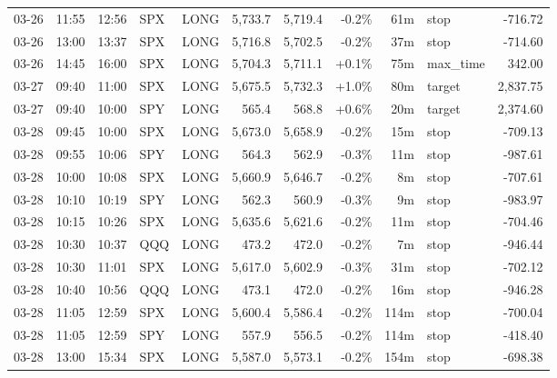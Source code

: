 \documentclass[11pt,a4paper,twoside]{article}
\begin{document}
\begin{center}
\begin{longtable}{>{\color{txtmain}}l l l l l r r r r >{\color{txtmain}}l r}
03-26 & 11:55 & 12:56 & SPX & LONG & 5,733.7 & 5,719.4 & \textcolor{lossred}{-0.2\%} & 61m & stop & \textcolor{lossred}{-716.72} \\
03-26 & 13:00 & 13:37 & SPX & LONG & 5,716.8 & 5,702.5 & \textcolor{lossred}{-0.2\%} & 37m & stop & \textcolor{lossred}{-714.60} \\
03-26 & 14:45 & 16:00 & SPX & LONG & 5,704.3 & 5,711.1 & \textcolor{wingreen}{+0.1\%} & 75m & max\_time & \textcolor{wingreen}{342.00} \\
03-27 & 09:40 & 11:00 & SPX & LONG & 5,675.5 & 5,732.3 & \textcolor{wingreen}{+1.0\%} & 80m & target & \textcolor{wingreen}{2,837.75} \\
03-27 & 09:40 & 10:00 & SPY & LONG & 565.4 & 568.8 & \textcolor{wingreen}{+0.6\%} & 20m & target & \textcolor{wingreen}{2,374.60} \\
03-28 & 09:45 & 10:00 & SPX & LONG & 5,673.0 & 5,658.9 & \textcolor{lossred}{-0.2\%} & 15m & stop & \textcolor{lossred}{-709.13} \\
03-28 & 09:55 & 10:06 & SPY & LONG & 564.3 & 562.9 & \textcolor{lossred}{-0.3\%} & 11m & stop & \textcolor{lossred}{-987.61} \\
03-28 & 10:00 & 10:08 & SPX & LONG & 5,660.9 & 5,646.7 & \textcolor{lossred}{-0.2\%} & 8m & stop & \textcolor{lossred}{-707.61} \\
03-28 & 10:10 & 10:19 & SPY & LONG & 562.3 & 560.9 & \textcolor{lossred}{-0.3\%} & 9m & stop & \textcolor{lossred}{-983.97} \\
03-28 & 10:15 & 10:26 & SPX & LONG & 5,635.6 & 5,621.6 & \textcolor{lossred}{-0.2\%} & 11m & stop & \textcolor{lossred}{-704.46} \\
03-28 & 10:30 & 10:37 & QQQ & LONG & 473.2 & 472.0 & \textcolor{lossred}{-0.2\%} & 7m & stop & \textcolor{lossred}{-946.44} \\
03-28 & 10:30 & 11:01 & SPX & LONG & 5,617.0 & 5,602.9 & \textcolor{lossred}{-0.3\%} & 31m & stop & \textcolor{lossred}{-702.12} \\
03-28 & 10:40 & 10:56 & QQQ & LONG & 473.1 & 472.0 & \textcolor{lossred}{-0.2\%} & 16m & stop & \textcolor{lossred}{-946.28} \\
03-28 & 11:05 & 12:59 & SPX & LONG & 5,600.4 & 5,586.4 & \textcolor{lossred}{-0.2\%} & 114m & stop & \textcolor{lossred}{-700.04} \\
03-28 & 11:05 & 12:59 & SPY & LONG & 557.9 & 556.5 & \textcolor{lossred}{-0.2\%} & 114m & stop & \textcolor{lossred}{-418.40} \\
03-28 & 13:00 & 15:34 & SPX & LONG & 5,587.0 & 5,573.1 & \textcolor{lossred}{-0.2\%} & 154m & stop & \textcolor{lossred}{-698.38} \\

\end{longtable}
\end{center}
\end{document}

